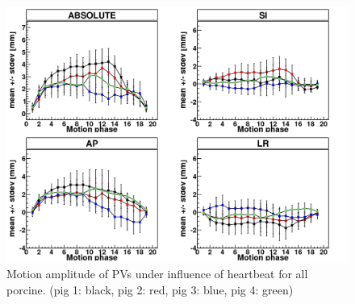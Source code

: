 \documentclass[type=dr, dr=rernat, accentcolor=tud7b,colorbacktitle, bigchapter, openright, twoside, 12pt ]{tudthesis}
\begin{document}


\newpage


\begin{figure}[H]
\begin{center}
 \includegraphics[scale=0.22]{Mayo_PV_HB.png}
\caption{Motion amplitude of PVs under influence of heartbeat for all porcine. (pig 1: black, pig 2: red, pig 3: blue, 
pig 4: green) }
\label{fig:motion_hb_all_pv}
\end{center}
\end{figure}
\end{document}
